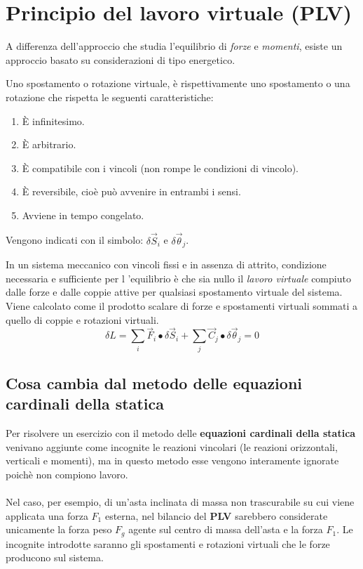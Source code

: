 \documentclass[main.tex]{subfiles}
\begin{document}
\section{Principio del lavoro virtuale (PLV)}
A differenza dell'approccio che studia l'equilibrio di \textit{forze} e \textit{momenti}, esiste un approccio basato su considerazioni di tipo energetico.

\begin{definition}
Uno spostamento o rotazione virtuale, è rispettivamente uno spostamento o una rotazione che rispetta le seguenti caratteristiche:
\begin{enumerate}
\item È infinitesimo.
\item È arbitrario.
\item È compatibile con i vincoli (non rompe le condizioni di vincolo).
\item È reversibile, cioè può avvenire in entrambi i sensi.
\item Avviene in tempo congelato.
\end{enumerate}
Vengono indicati con il simbolo: $\delta\vec{S}_i$ e $\delta\vec{\theta}_j$.
\end{definition}

\begin{definition}
In un sistema meccanico con vincoli fissi e in assenza di attrito, condizione necessaria e sufficiente per l ’equilibrio è che sia nullo il \textit{lavoro virtuale} compiuto dalle forze e dalle coppie attive per qualsiasi spostamento virtuale del sistema.
\\
Viene calcolato come il prodotto scalare di forze e spostamenti virtuali sommati a quello di coppie e rotazioni virtuali.
\[
	\delta L = \sum_i \vec{F}_i\bullet \delta\vec{S}_i + \sum_j \vec{C}_j\bullet \delta\vec{\theta}_j = 0
\]
\end{definition}

\subsection{Cosa cambia dal metodo delle equazioni cardinali della statica}
Per risolvere un esercizio con il metodo delle \textbf{equazioni cardinali della statica} venivano aggiunte come incognite le reazioni vincolari (le reazioni orizzontali, verticali e momenti), ma in questo metodo esse vengono interamente ignorate poichè non compiono lavoro.
\\
\\
Nel caso, per esempio, di un'asta inclinata di massa non trascurabile su cui viene applicata una forza $F_1$ esterna, nel bilancio del \textbf{PLV} sarebbero considerate unicamente la forza peso $F_g$ agente sul centro di massa dell'asta e la forza $F_1$. Le incognite introdotte saranno gli spostamenti e rotazioni virtuali che le forze producono sul sistema.
\end{document}

